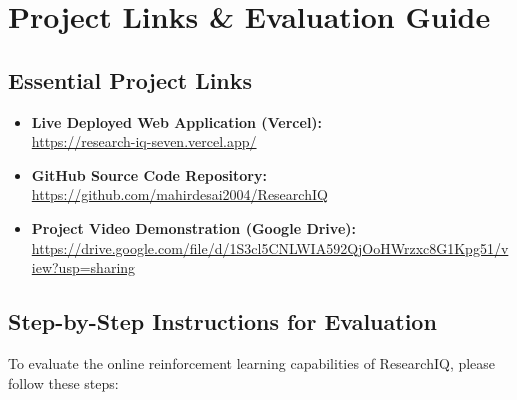\documentclass[11pt,a4paper]{article}
\begin{document}
\newpage

\section*{\centering Project Links \& Evaluation Guide}

\vspace{0.4cm}

\subsection*{Essential Project Links}
\begin{itemize}[leftmargin=1.8em, itemsep=6pt]
    \item \textbf{Live Deployed Web Application (Vercel):} \\
    \url{https://research-iq-seven.vercel.app/}
    
    \item \textbf{GitHub Source Code Repository:} \\
    \url{https://github.com/mahirdesai2004/ResearchIQ}
    
    \item \textbf{Project Video Demonstration (Google Drive):} \\
    \url{https://drive.google.com/file/d/1S3cl5CNLWIA592QjOoHWrzxc8G1Kpg51/view?usp=sharing}
\end{itemize}

\vspace{0.6cm}

\subsection*{Step-by-Step Instructions for Evaluation}
To evaluate the online reinforcement learning capabilities of ResearchIQ, please follow these steps:
\end{document}
